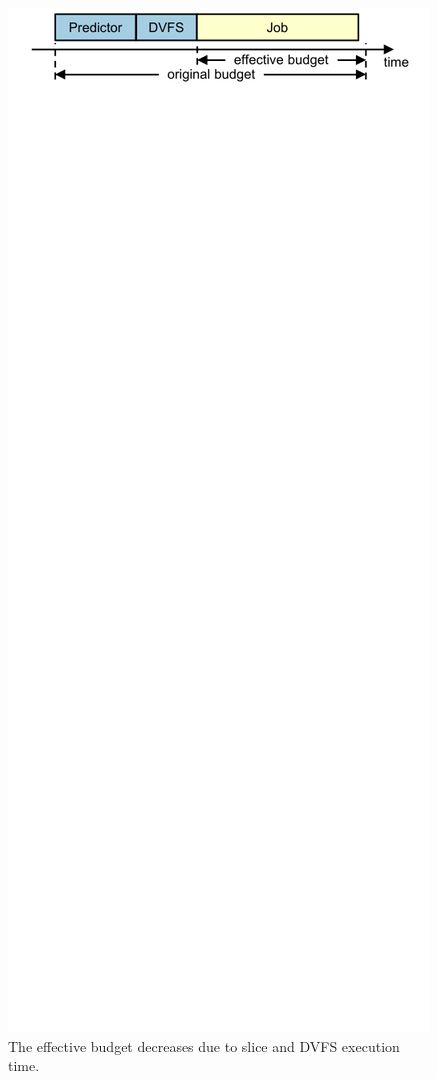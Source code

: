 \begin{figure}
  \begin{center}
    \includegraphics{exec_time_prediction/figs/effective_budget.pdf}
    \caption{The effective budget decreases due to slice and DVFS execution time.}
    \label{fig:exec_time_prediction.prediction.effective_budget}
  \end{center}
\end{figure}

